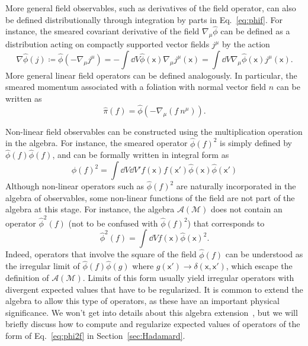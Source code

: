 \documentclass[letterpaper,12pt,titlepage,oneside,final]{book}
\newcommand{\M}{\mathcal{M}}
\newcommand{\mf}{\mathsf}%
\begin{document}
More general field observables, such as derivatives of the field operator, can also be defined distributionally through integration by parts in Eq.~\eqref{eq:phif}. For instance, the smeared covariant derivative of the field $\nabla_\mu\hat{\phi}$ can be defined as a distribution acting on compactly supported vector fields $j^\mu$ by the action
\begin{equation}
    \nabla\hat{\phi}(j) \coloneqq \hat{\phi}(- \nabla_\mu j^\mu) = -\int \dd V \hat{\phi}(\mf x)\nabla_\mu j^\mu(\mf x) = \int \dd V \nabla_\mu \hat{\phi}(\mf x) j^\mu(\mf x).    
\end{equation}
More general linear field operators can be defined analogously. In particular, the smeared momentum associated with a foliation with normal vector field $n$ can be written as
\begin{equation}
    \hat{\pi}(f) = \hat{\phi}(-\nabla_\mu(f\!\:n^\mu)).
\end{equation}

Non-linear field observables can be constructed using the multiplication operation in the algebra. For instance, the smeared operator $\hat{\phi}(f)^2$ is simply defined by $\hat{\phi}(f)\hat{\phi}(f)$, and can be formally written in integral form as
\begin{equation}\label{eq:phif2}
    \hat{\phi}(f)^2 = \int \dd V \dd V' f(\mf x) f(\mf x') \hat{\phi}(\mf x) \hat{\phi}(\mf x')    
\end{equation}
Although non-linear operators such as $\hat{\phi}(f)^2$ are naturally incorporated in the algebra of observables, some non-linear functions of the field are not part of the algebra at this stage. For instance, the algebra $\mathcal{A}(\M)$ does not contain an operator $\hat{\phi}^2(f)$ (not to be confused with $\hat{\phi}(f)^2$) that corresponds to
\begin{equation}\label{eq:phi2f}
    \hat{\phi}^2(f) = \int \dd V f(\mf x)\hat{\phi}(\mf x)^2.
\end{equation}
Indeed, operators that involve the square of the field $\hat{\phi}(f)$ can be understood as the irregular limit of $\hat{\phi}(f)\hat{\phi}(g)$ where $g(\mf x')\to\delta(\mf x, \mf x')$, which escape the definition of $\mathcal{A}(\M)$. Limits of this form usually yield irregular operators with divergent expected values that have to be regularized. It is common to extend the algebra to allow this type of operators, as these have an important physical significance. We won't get into details about this algebra extension~\cite{TheBookHadamard}, but we will briefly discuss how to compute and regularize expected values of operators of the form of Eq.~\eqref{eq:phi2f} in Section~\ref{sec:Hadamard}.
\end{document}
